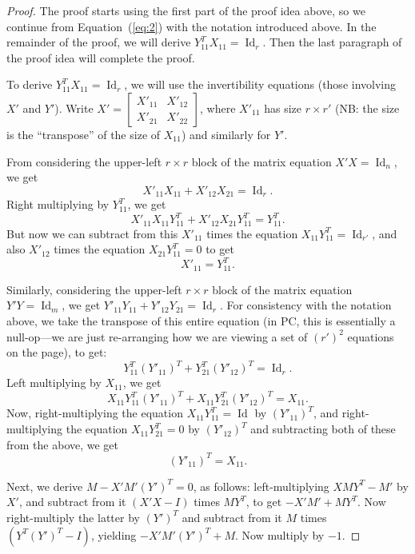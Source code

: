 \documentclass[10pt,a4paper]{article}
\theoremstyle{definition}
\DeclareMathOperator{\Id}{Id}
\begin{document}
\begin{proof}
The proof starts using the first part of the proof idea above, so we continue from Equation~(\ref{eq:2}) with the notation introduced above.
In the remainder of the proof, we will derive $Y_{11}^T X_{11} = \Id_r$. Then the last paragraph of the proof idea will complete the proof.

To derive $Y_{11}^T X_{11} = \Id_r$, we will use the invertibility equations (those involving $X'$ and $Y'$). Write $X' = \begin{bmatrix} X'_{11} & X'_{12} \\ X'_{21} & X'_{22} \end{bmatrix}$, where $X'_{11}$ has size $r \times r'$ (NB: the size is the ``transpose'' of the size of $X_{11}$) and similarly for $Y'$. 

From considering the upper-left $r \times r$ block of the matrix equation $X' X = \Id_n$, we get
\[
X'_{11} X_{11} + X'_{12} X_{21} = \Id_r.
\]
Right multiplying by $Y_{11}^T$, we get
\[
X'_{11} X_{11} Y_{11}^T + X'_{12} X_{21} Y_{11}^T = Y_{11}^T. 
\]
But now we can subtract from this $X'_{11}$ times the equation $X_{11} Y_{11}^T = \Id_{r'}$, and also $X'_{12}$ times the equation $X_{21} Y_{11}^T = 0$ to get
\begin{equation}
X'_{11} = Y_{11}^T.
\end{equation}

Similarly, considering the upper-left $r \times r$ block of the matrix equation $Y' Y = \Id_m$, we get $Y'_{11} Y_{11} + Y'_{12} Y_{21} = \Id_{r}$. For consistency with the notation above, we take the transpose of this entire equation (in PC, this is essentially a null-op---we are just re-arranging how we are viewing a set of $(r')^2$ equations on the page), to get:
\[
Y_{11}^T (Y'_{11})^T + Y_{21}^T (Y'_{12})^T = \Id_r.
\]
Left multiplying by $X_{11}$, we get
\[
X_{11} Y_{11}^T (Y'_{11})^T + X_{11} Y_{21}^T (Y'_{12})^T = X_{11}.
\]
Now, right-multiplying the equation $X_{11} Y_{11}^T = \Id$ by $(Y'_{11})^T$, and right-multiplying the equation $X_{11} Y_{21}^T = 0$ by $(Y'_{12})^T$ and subtracting both of these from the above, we get
\begin{equation}
(Y'_{11})^T = X_{11}.
\end{equation}

Next, we derive $M - X' M' (Y')^T=0$, as follows: left-multiplying $XMY^T - M'$ by $X'$, and subtract from it $(X'X-I)$ times $MY^T$, to get $-X'M' + MY^T$. Now right-multiply the latter by $(Y')^T$ and subtract from it $M$ times $(Y^T (Y')^T - I)$, yielding $-X'M'(Y')^T + M$. Now multiply by $-1$.


\end{proof}
\end{document}
